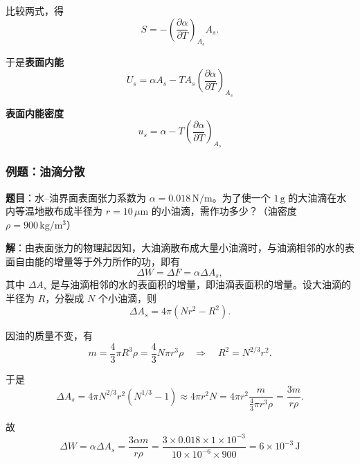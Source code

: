 \documentclass[UTF8]{ctexart}
\theoremstyle{definition}
\begin{document}
比较两式，得
\begin{equation}
S = -\left(\frac{\partial\alpha}{\partial T}\right)_{A_s}A_s.
\end{equation}

于是\textbf{表面内能}
\begin{equation}
\boxed{U_s = \alpha A_s - TA_s\left(\frac{\partial\alpha}{\partial T}\right)_{A_s}}
\end{equation}

\textbf{表面内能密度}
\begin{equation}
\boxed{u_s = \alpha - T\left(\frac{\partial\alpha}{\partial T}\right)_{A_s}}
\end{equation}

\subsubsection*{例题：油滴分散}

\textbf{题目}：水--油界面表面张力系数为 $\alpha=0.018\,\mathrm{N/m}$。为了使一个 $1\,\mathrm{g}$ 的大油滴在水内等温地散布成半径为 $r=10\,\mu\mathrm{m}$ 的小油滴，需作功多少？（油密度 $\rho=900\,\mathrm{kg/m^3}$）

\textbf{解}：由表面张力的物理起因知，大油滴散布成大量小油滴时，与油滴相邻的水的表面自由能的增量等于外力所作的功，即有
\begin{equation}
\Delta W = \Delta F = \alpha\Delta A_s,
\end{equation}
其中 $\Delta A_s$ 是与油滴相邻的水的表面积的增量，即油滴表面积的增量。设大油滴的半径为 $R$，分裂成 $N$ 个小油滴，则
\begin{equation}
\Delta A_s = 4\pi(Nr^2 - R^2).
\end{equation}

因油的质量不变，有
\begin{equation}
m = \frac{4}{3}\pi R^3\rho = \frac{4}{3}N\pi r^3\rho
\quad\Rightarrow\quad
R^2 = N^{2/3}r^2.
\end{equation}

于是
\begin{equation}
\Delta A_s = 4\pi N^{2/3}r^2(N^{1/3}-1) \approx 4\pi r^2 N
= 4\pi r^2\frac{m}{\frac{4}{3}\pi r^3\rho}
= \frac{3m}{r\rho}.
\end{equation}

故
\begin{equation}
\boxed{\Delta W = \alpha\Delta A_s = \frac{3\alpha m}{r\rho}
= \frac{3\times0.018\times1\times10^{-3}}{10\times10^{-6}\times900}
= 6\times10^{-3}\,\mathrm{J}}
\end{equation}
\end{document}
